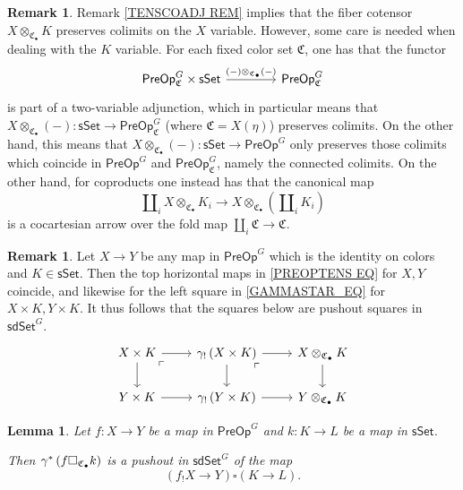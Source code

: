 \documentclass[a4paper,10pt]{article}%
\numberwithin{equation}{section}
\numberwithin{figure}{section}
\newtheorem{lemma}[equation]{Lemma}%
\theoremstyle{definition} %
\newtheorem{remark}[equation]{Remark}%
\newcommand{\1}{\ensuremath{\mathbbm 1}}%
\begin{document}
\begin{remark}\label{NOTTWOVARADJ REM}
	Remark \ref{TENSCOADJ REM} implies that the fiber cotensor
	$X \otimes_{\mathfrak{C}_{\bullet}} K$
	preserves colimits on the $X$ variable.
	However, some care is needed when dealing with the 
	$K$ variable.
	For each fixed color set $\mathfrak{C}$, one has that the functor
\[
\begin{tikzcd}[row sep = 0, column sep = 40pt]
	\mathsf{PreOp}^G_{\mathfrak{C}} \times \mathsf{sSet} \ar{r}{(-)\otimes_{\mathfrak{C}_{\bullet}}(-)} 
&
	\mathsf{PreOp}^G_{\mathfrak{C}}
\end{tikzcd}
\]
is part of a two-variable adjunction,
which in particular means that
$X \otimes_{\mathfrak{C}_{\bullet}} (-) \colon 
\mathsf{sSet} \to \mathsf{PreOp}^G_{\mathfrak{C}}$ 
(where $\mathfrak{C}=X(\eta)$)
preserves colimits.
On the other hand, this means that
$X \otimes_{\mathfrak{C}_{\bullet}} (-) \colon
\mathsf{sSet} \to \mathsf{PreOp}^G$
only preserves those colimits which coincide in
$\mathsf{PreOp}^G$ and $\mathsf{PreOp}^G_{\mathfrak{C}}$,
namely the connected colimits.
%
On the other hand, for coproducts one instead has that the canonical map
\[
\amalg_i X \otimes_{\mathfrak{C}_{\bullet}} K_i
	\to
X \otimes_{\mathfrak{C}_{\bullet}} (\amalg_i K_i)
\]
is a cocartesian arrow over the fold map
$\amalg_i \mathfrak{C} \to \mathfrak{C}$.
\end{remark}




\begin{remark}\label{COLORTENSGAM REM}
	Let $X \to Y$ be any map in $\mathsf{PreOp}^G$
	which is the identity on colors and 
	$K \in \mathsf{sSet}$. 
	Then the top horizontal maps in \eqref{PREOPTENS EQ}
	for $X,Y$ coincide, 
	and likewise for the 
	left square in \eqref{GAMMASTAR_EQ} for
	$X \times K, Y \times K$.
%
	It thus follows that the squares below are pushout squares in $\mathsf{sdSet}^G$.
\[
\begin{tikzcd}
	X \times K \ar{r} \ar{d} 
	\arrow[dr, phantom, "\ulcorner", very near start] 
&
	\gamma_! \left( X \times K \right) \ar{r} \ar{d} 
	\arrow[dr, phantom, "\ulcorner", very near start] 
&
	X \otimes_{\mathfrak{C}_{\bullet}} K \ar{d}
\\
	Y \times K \ar{r} 
&
	\gamma_! \left( Y \times K \right) \ar{r} 
&
	Y \otimes_{\mathfrak{C}_{\bullet}} K
\end{tikzcd}
\]
\end{remark}



\begin{lemma}\label{OTIMSETPUSH LEM}
	Let $f\colon X \to Y$ be a map in $\mathsf{PreOp}^G$
	and $k \colon K \to L$ be a map in $\mathsf{sSet}$.

	Then $\gamma^{\**}\left(f \square_{\mathfrak{C}_{\bullet}} k\right)$
	is a pushout in $\mathsf{sdSet}^G$
	of the map
\[
	\left(f_! X \to Y\right)
	\square
	\left( K \to L \right).
\]
\end{lemma}
\end{document}
